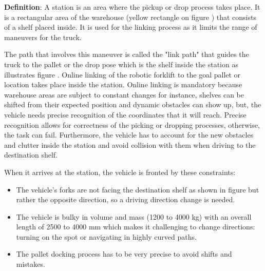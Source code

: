 \textbf{Definition}: A station is an area where the pickup or drop process takes place. 
It is a rectangular area of the warehouse (yellow rectangle on figure ) that consists of a 
shelf placed inside. It is used for the linking process as it limits the range of maneuvers for the truck.

The path that involves this maneuver is called the "link path" that guides the truck to the pallet or the drop 
pose which is the shelf inside the station as illustrates figure . Online linking of the robotic 
forklift to the goal pallet or location takes place inside
the station. Online linking is mandatory because warehouse areas are subject to constant changes for instance,
shelves can be shifted from their expected
position and dynamic obstacles can show up, but, the vehicle needs precise recognition of the coordinates 
that it will reach. 
Precise recognition allows for correctness of the picking or dropping processes, otherwise, 
the task can fail. Furthermore, the vehicle has to account for the new obstacles and clutter inside the 
station and avoid collision with them when driving to the destination shelf.

When it arrives at the station, the vehicle is fronted by these constraints:
\begin{itemize}
    \item The vehicle’s forks are not facing the destination shelf as shown in figure  
    but rather the opposite direction, 
    so a driving direction change is needed. 

    \item The vehicle is bulky in volume and mass (1200 to 4000 kg) with an overall 
    length of 2500 to 4000 mm  \cite{R5}
    which makes it challenging  to change directions: turning on the spot or 
    navigating in highly curved paths. 
    
    \item The pallet docking process has to be very precise to avoid shifts and mistakes. 
\end{itemize}


